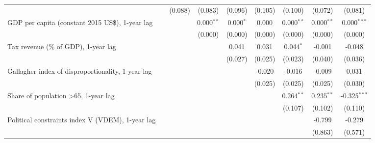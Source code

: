 \begin{table}[htbp]
\begin{tabular}{lcccccccc}
                                                                                             &              & (0.088)      & (0.083)       & (0.096)       & (0.105)       & (0.100)       & (0.072)      & (0.081)\\   
      GDP per capita (constant 2015 US\$), 1-year lag                                        &              &              & 0.000$^{**}$  & 0.000$^{*}$   & 0.000         & 0.000$^{**}$  & 0.000$^{**}$ & 0.000$^{***}$\\   
                                                                                             &              &              & (0.000)       & (0.000)       & (0.000)       & (0.000)       & (0.000)      & (0.000)\\   
      Tax revenue (\% of GDP), 1-year lag                                                    &              &              &               & 0.041         & 0.031         & 0.044$^{*}$   & -0.001       & -0.048\\   
                                                                                             &              &              &               & (0.027)       & (0.025)       & (0.023)       & (0.040)      & (0.036)\\   
      Gallagher index of disproportionality, 1-year lag                                      &              &              &               &               & -0.020        & -0.016        & -0.009       & 0.031\\   
                                                                                             &              &              &               &               & (0.025)       & (0.025)       & (0.025)      & (0.030)\\   
      Share of population >65, 1-year lag                                                    &              &              &               &               &               & 0.264$^{**}$  & 0.235$^{**}$ & -0.325$^{***}$\\   
                                                                                             &              &              &               &               &               & (0.107)       & (0.102)      & (0.110)\\   
      Political constraints index V (VDEM), 1-year lag                                       &              &              &               &               &               &               & -0.799       & -0.279\\   
                                                                                             &              &              &               &               &               &               & (0.863)      & (0.571)\\   

\end{tabular}
\end{table}
